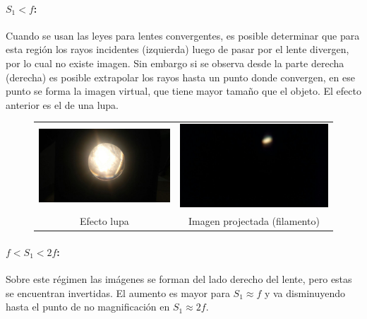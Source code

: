 \documentclass[addpoints,10pt]{exam}
\begin{document}
\begin{questions}
		\paragraph{$S_1 < f$:}
			Cuando se usan las leyes para lentes convergentes, es posible determinar que para esta regi\'on los rayos incidentes (izquierda) luego de pasar por el lente divergen, por lo cual no existe imagen. Sin embargo si se observa desde la parte derecha (derecha) es posible extrapolar los rayos hasta un punto donde convergen, en ese punto se forma la imagen virtual, que tiene mayor tama\~no que el objeto. El efecto anterior es el de una lupa.
			\begin{figure}[h]
				\centering
				\begin{tabular}{cc}
					\includegraphics[width = 0.4\linewidth]{lupa.jpeg} & \includegraphics[width = 0.4\linewidth]{bombillo.jpeg} \\
					Efecto lupa & Imagen projectada (filamento)
				\end{tabular}
				
			\end{figure}
			
		\paragraph{$f < S_1 < 2f$:} 
			Sobre este r\'egimen las im\'agenes se forman del lado derecho del lente, pero estas se encuentran invertidas. El aumento es mayor para $S_1 \approx f$ y va disminuyendo hasta el punto de no magnificaci\'on en $S_1 \approx 2f$. 
			
		\newpage
		

\end{questions}
\end{document}
